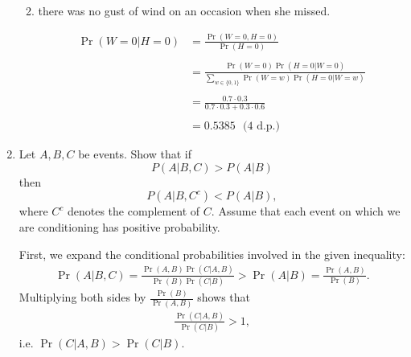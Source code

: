 \begin{enumerate}[label=(\alph*)]
\begin{enumerate}[label=(\roman*)]
\begin{mdframed}
$$            $$
          \end{mdframed}
        \item there was no gust of wind on an occasion when she missed.
          \begin{mdframed}
            \begin{align*}
              \Pr(W=0|H=0)
              &= \frac{\Pr(W=0, H=0)}{\Pr(H=0)} \\\\
              &= \frac{\Pr(W=0) \Pr(H=0|W=0)}{\sum_{w \in \{0, 1\}} \Pr(W=w) \Pr(H=0|W=w)} \\\\
              &= \frac{0.7 \cdot 0.3}{0.7 \cdot 0.3 + 0.3 \cdot 0.6} \\\\
              &= 0.5385 ~~~\text{(4 d.p.)}
            \end{align*}
          \end{mdframed}
    \end{enumerate}

  \item Let $A, B, C$ be events. Show that if $$P(A|B, C) > P(A|B)$$
    then $$P(A|B, C^c) < P(A|B),$$ where $C^c$ denotes the complement of
    $C$. Assume that each event on which we are conditioning has positive
    probability.



    \begin{mdframed}

      First, we expand the conditional probabilities involved in the given inequality:
      \begin{align*}
        \Pr(A|B,C) = \frac{\Pr(A,B)\Pr(C|A,B)}{\Pr(B)\Pr(C|B)} > \Pr(A|B) = \frac{\Pr(A,B)}{\Pr(B)}.
      \end{align*}
      Multiplying both sides by $\frac{\Pr(B)}{\Pr(A,B)}$ shows that
      \begin{align*}
        \frac{\Pr(C|A,B)}{\Pr(C|B)} > 1,
      \end{align*}
      i.e. $\Pr(C|A,B) > \Pr(C|B)$.


\end{mdframed}
\end{enumerate}
